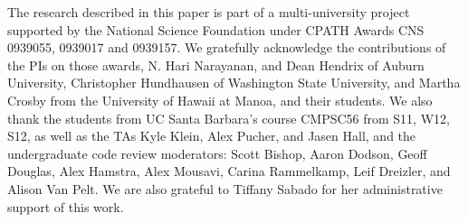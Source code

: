 
The research described in this paper is part of a multi-university
project supported by the National Science Foundation under CPATH
Awards CNS 0939055, 0939017 and 0939157. We gratefully acknowledge the
contributions of the PIs on those awards, N. Hari Narayanan, and Dean
Hendrix of Auburn University, Christopher Hundhausen of Washington
State University, and Martha Crosby from the University of Hawaii at
Manoa, and their students.  We also thank the students from UC Santa
Barbara's course CMPSC56 from S11, W12, S12, as well as the
TAs Kyle Klein, Alex Pucher, and Jasen Hall, and the 
undergraduate code review moderators: 
Scott Bishop,
Aaron Dodson, 
Geoff Douglas,
Alex Hamstra, 
Alex Mousavi, 
Carina Rammelkamp, 
Leif Dreizler, 
and 
Alison Van Pelt. 
We are also grateful to Tiffany Sabado for her
administrative support of this work.



